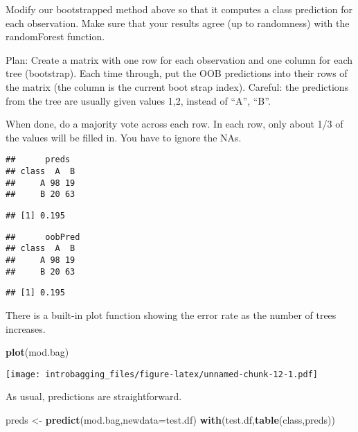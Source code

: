 \documentclass[]{article}
\newenvironment{Shaded}{\begin{snugshade}}{\end{snugshade}}
\newcommand{\DataTypeTok}[1]{\textcolor[rgb]{0.13,0.29,0.53}{#1}}
\newcommand{\KeywordTok}[1]{\textcolor[rgb]{0.13,0.29,0.53}{\textbf{#1}}}
\newcommand{\NormalTok}[1]{#1}
\newcommand{\StringTok}[1]{\textcolor[rgb]{0.31,0.60,0.02}{#1}}
\begin{document}
Modify our bootstrapped method above so that it computes a class
prediction for each observation. Make sure that your results agree (up
to randomness) with the randomForest function.

Plan: Create a matrix with one row for each observation and one column
for each tree (bootstrap). Each time through, put the OOB predictions
into their rows of the matrix (the column is the current boot strap
index). Careful: the predictions from the tree are usually given values
1,2, instead of ``A'', ``B''.

When done, do a majority vote across each row. In each row, only about
1/3 of the values will be filled in. You have to ignore the NAs.

\begin{verbatim}
##      preds
## class  A  B
##     A 98 19
##     B 20 63
\end{verbatim}

\begin{verbatim}
## [1] 0.195
\end{verbatim}

\begin{verbatim}
##      oobPred
## class  A  B
##     A 98 19
##     B 20 63
\end{verbatim}

\begin{verbatim}
## [1] 0.195
\end{verbatim}

There is a built-in plot function showing the error rate as the number
of trees increases.

\begin{Shaded}
\begin{Highlighting}[]
\KeywordTok{plot}\NormalTok{(mod.bag)}
\end{Highlighting}
\end{Shaded}

\texttt{[image: introbagging\_files/figure-latex/unnamed-chunk-12-1.pdf]}

As usual, predictions are straightforward.

\begin{Shaded}
\begin{Highlighting}[]
\NormalTok{preds <-}\StringTok{ }\KeywordTok{predict}\NormalTok{(mod.bag,}\DataTypeTok{newdata=}\NormalTok{test.df)}
\KeywordTok{with}\NormalTok{(test.df,}\KeywordTok{table}\NormalTok{(class,preds))}
\end{Highlighting}
\end{Shaded}
\end{document}
